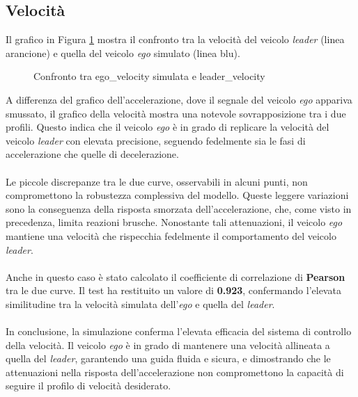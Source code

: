 \subsection{Velocità}
Il grafico in Figura \ref{fig:vel_leader_ego} mostra il confronto tra la velocità del veicolo \emph{leader} 
(linea arancione) e quella del veicolo \emph{ego} simulato (linea blu).
\begin{figure}[H]
    \centering
    \caption{Confronto tra ego\_velocity simulata e leader\_velocity}
    \label{fig:vel_leader_ego}
\end{figure}
\noindent A differenza del grafico dell'accelerazione, dove il segnale del veicolo \emph{ego} appariva smussato, il grafico della 
velocità mostra una notevole sovrapposizione tra i due profili. Questo indica che il veicolo \emph{ego} è in grado di replicare la
velocità del veicolo \emph{leader} con elevata precisione, seguendo fedelmente sia le fasi di accelerazione che quelle di decelerazione.
\\\\
\noindent Le piccole discrepanze tra le due curve, osservabili in alcuni punti, non compromettono la robustezza complessiva del modello. 
Queste leggere variazioni sono la conseguenza della risposta smorzata dell'accelerazione, che, come visto in precedenza, 
limita reazioni brusche. Nonostante tali attenuazioni, il veicolo \emph{ego} mantiene una velocità che rispecchia fedelmente 
il comportamento del veicolo \emph{leader}.
\\\\
\noindent Anche in questo caso è stato calcolato il coefficiente di correlazione 
di \textbf{Pearson} tra le due curve. Il test ha restituito un valore di \textbf{0.923}, confermando l'elevata similitudine tra la 
velocità simulata dell'\emph{ego} e quella del \emph{leader}.
\\\\
\noindent In conclusione, la simulazione conferma l'elevata efficacia del sistema di controllo della velocità. Il veicolo \emph{ego}
è in grado di mantenere una velocità allineata a quella del \emph{leader}, garantendo una guida fluida e sicura, 
e dimostrando che le attenuazioni nella risposta dell'accelerazione non compromettono la capacità di seguire il profilo di velocità 
desiderato.
